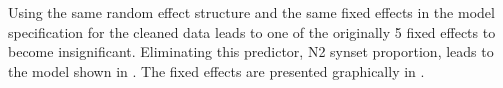 Using the same random effect structure and the same fixed effects in
the model specification for the cleaned data leads to one of the
originally 5 fixed effects to become insignificant. Eliminating this
predictor, N2 synset proportion, leads to the model shown in . The fixed effects are presented graphically in .
\begin{table}[!htb]

\end{table}
